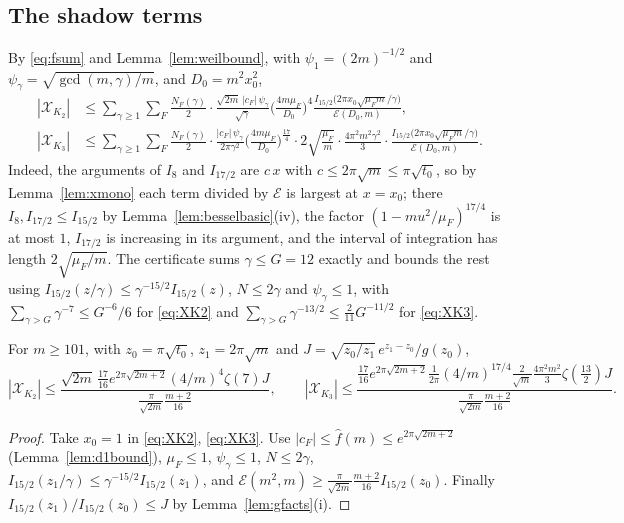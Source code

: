\subsection{The shadow terms}
By \eqref{eq:fsum} and Lemma~\ref{lem:weilbound}, with $\psi_1=(2m)^{-1/2}$ and $\psi_\gamma=\sqrt{\gcd(m,\gamma)/m}$, and $D_0=m^2x_0^2$,
\begin{align}
|\mathcal X_{K_2}|&\le\sum_{\gamma\ge1}\sum_F\frac{N_F(\gamma)}2\cdot\frac{\sqrt{2m}\,|c_F|\,\psi_\gamma}{\sqrt\gamma}\Big(\frac{4m\mu_F}{D_0}\Big)^4\frac{I_{15/2}\big(2\pi x_0\sqrt{\mu_Fm}/\gamma\big)}{\mathcal E(D_0,m)},\label{eq:XK2}\\
|\mathcal X_{K_3}|&\le\sum_{\gamma\ge1}\sum_F\frac{N_F(\gamma)}2\cdot\frac{|c_F|\,\psi_\gamma}{2\pi\gamma^2}\Big(\frac{4m\mu_F}{D_0}\Big)^{\frac{17}4}\cdot2\sqrt{\frac{\mu_F}m}\cdot\frac{4\pi^2m^2\gamma^2}3\cdot\frac{I_{15/2}\big(2\pi x_0\sqrt{\mu_Fm}/\gamma\big)}{\mathcal E(D_0,m)}.\label{eq:XK3}
\end{align}
Indeed, the arguments of $I_8$ and $I_{17/2}$ are $c\,x$ with $c\le2\pi\sqrt m\le\pi\sqrt{t_0}$, so by Lemma~\ref{lem:xmono} each term divided by $\mathcal E$ is largest at $x=x_0$; there $I_8,I_{17/2}\le I_{15/2}$ by Lemma~\ref{lem:besselbasic}(iv), the factor $(1-mu^2/\mu_F)^{17/4}$ is at most $1$, $I_{17/2}$ is increasing in its argument, and the interval of integration has length $2\sqrt{\mu_F/m}$. The certificate sums $\gamma\le G=12$ exactly and bounds the rest using $I_{15/2}(z/\gamma)\le\gamma^{-15/2}I_{15/2}(z)$, $N\le2\gamma$ and $\psi_\gamma\le1$, with $\sum_{\gamma>G}\gamma^{-7}\le G^{-6}/6$ for \eqref{eq:XK2} and $\sum_{\gamma>G}\gamma^{-13/2}\le\frac2{11}G^{-11/2}$ for \eqref{eq:XK3}.

\begin{lemma}\label{lem:mockbig}
For $m\ge101$, with $z_0=\pi\sqrt{t_0}$, $z_1=2\pi\sqrt m$ and $J=\sqrt{z_0/z_1}\,e^{z_1-z_0}/g(z_0)$,
\[
|\mathcal X_{K_2}|\le\frac{\sqrt{2m}\,\frac{17}{16}e^{2\pi\sqrt{2m+2}}(4/m)^4\zeta(7)J}{\frac{\pi}{\sqrt{2m}}\frac{m+2}{16}},\qquad |\mathcal X_{K_3}|\le\frac{\frac{17}{16}e^{2\pi\sqrt{2m+2}}\frac{1}{2\pi}(4/m)^{17/4}\frac2{\sqrt m}\frac{4\pi^2m^2}3\zeta(\frac{13}2)J}{\frac{\pi}{\sqrt{2m}}\frac{m+2}{16}}.
\]
\end{lemma}

\begin{proof}
Take $x_0=1$ in \eqref{eq:XK2}, \eqref{eq:XK3}. Use $|c_F|\le\hat f(m)\le e^{2\pi\sqrt{2m+2}}$ (Lemma~\ref{lem:d1bound}), $\mu_F\le1$, $\psi_\gamma\le1$, $N\le2\gamma$, $I_{15/2}(z_1/\gamma)\le\gamma^{-15/2}I_{15/2}(z_1)$, and $\mathcal E(m^2,m)\ge\frac\pi{\sqrt{2m}}\frac{m+2}{16}I_{15/2}(z_0)$. Finally $I_{15/2}(z_1)/I_{15/2}(z_0)\le J$ by Lemma~\ref{lem:gfacts}(i).
\end{proof}
